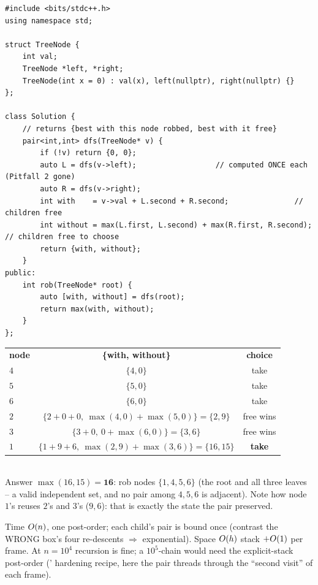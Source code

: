 \begin{lstlisting}[caption={House Robber III (LeetCode 337) -- two-channel return}, label={lst:c02-rob}]
#include <bits/stdc++.h>
using namespace std;

struct TreeNode {
    int val;
    TreeNode *left, *right;
    TreeNode(int x = 0) : val(x), left(nullptr), right(nullptr) {}
};

class Solution {
    // returns {best with this node robbed, best with it free}
    pair<int,int> dfs(TreeNode* v) {
        if (!v) return {0, 0};
        auto L = dfs(v->left);                  // computed ONCE each (Pitfall 2 gone)
        auto R = dfs(v->right);
        int with    = v->val + L.second + R.second;               // children free
        int without = max(L.first, L.second) + max(R.first, R.second); // children free to choose
        return {with, without};
    }
public:
    int rob(TreeNode* root) {
        auto [with, without] = dfs(root);
        return max(with, without);
    }
};
\end{lstlisting}

\begin{tracebox}[On $R$ (amounts $1,2,3,4,5,6$ at $1,2,3,4,5,6$)]
\begin{tabular}[t]{@{}lcc@{}}
\textbf{node} & \textbf{\{with, without\}} & \textbf{choice} \\
$4$ & $\{4,0\}$ & take \\
$5$ & $\{5,0\}$ & take \\
$6$ & $\{6,0\}$ & take \\
$2$ & $\{2{+}0{+}0,\ \max(4,0){+}\max(5,0)\}{=}\{2,9\}$ & free wins \\
$3$ & $\{3{+}0,\ 0{+}\max(6,0)\}{=}\{3,6\}$ & free wins \\
$1$ & $\{1{+}9{+}6,\ \max(2,9){+}\max(3,6)\}{=}\{16,15\}$ & \textbf{take} \\
\end{tabular}\\
Answer $\max(16,15)=\mathbf{16}$: rob nodes $\{1,4,5,6\}$ (the root and all
three leaves -- a valid independent set, and no pair among $4,5,6$ is
adjacent). Note how node $1$'s  reuses $2$'s and $3$'s
 ($9,6$): that is exactly the state the pair preserved.
\end{tracebox}

\begin{complexitybox}
Time $O(n)$, one post-order; each child's pair is bound once (contrast the
WRONG box's four re-descents $\Rightarrow$ exponential). Space $O(h)$ stack
$+O(1)$ per frame. At $n=10^{4}$ recursion is fine; a $10^{5}$-chain would
need the explicit-stack post-order (' hardening recipe,
here the pair threads through the ``second visit'' of each frame).
\end{complexitybox}

